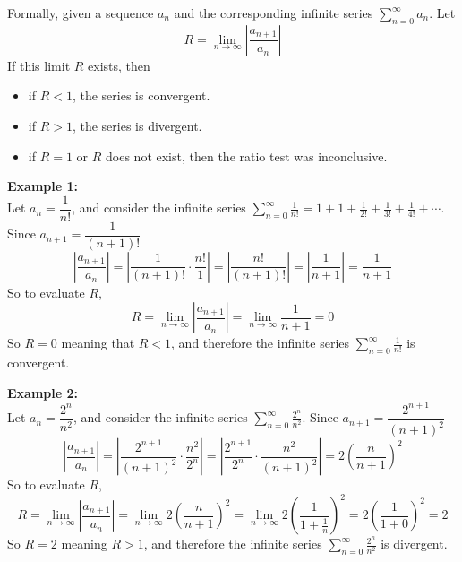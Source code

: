 \documentclass[]{report}
\begin{document}
Formally, given a sequence $a_n$ and the corresponding infinite series $\displaystyle \sum_{n=0}^\infty a_n$. Let
\begin{equation*}
  R=\lim_{n \to \infty} \left|\frac{a_{n+1}}{a_n}\right|
\end{equation*}
If this limit $R$ exists, then
\begin{itemize}
\item if $R<1$, the series is convergent.
\item if $R>1$, the series is divergent.
\item if $R=1$ or $R$ does not exist, then the ratio test was inconclusive.
\end{itemize}
\noindent  \textbf{Example 1:}\\
Let $a_n=\dfrac{1}{n!}$, and consider the infinite series $\displaystyle \sum_{n=0}^{\infty} \frac{1}{n!} = 1+1+\frac{1}{2!}+\frac{1}{3!}+\frac{1}{4!}+\cdots$. Since $a_{n+1}=\dfrac{1}{(n+1)!}$
\begin{equation*}
  \left| \frac{a_{n+1}}{a_n}\right|=\left| \frac{1}{(n+1)!}\cdot \frac{n!}{1}\right|=\left| \frac{n!}{(n+1)!}\right|=\left| \frac{1}{n+1}\right|=\frac{1}{n+1}
\end{equation*}
So to evaluate $R$,
\begin{equation*}
  R=\lim_{n \to \infty} \left|\frac{a_{n+1}}{a_n}\right|=\lim_{n \to \infty} \frac{1}{n+1}=0
\end{equation*}
So $R=0$ meaning that $R<1$, and therefore the infinite series $ \sum_{n=0}^{\infty} \frac{1}{n!}$ is convergent.

\noindent  \textbf{Example 2:}\\
Let $a_n=\dfrac{2^n}{n^2}$, and consider the infinite series $\displaystyle \sum_{n=0}^{\infty} \frac{2^n}{n^2}$. Since $a_{n+1}=\dfrac{2^{n+1}}{(n+1)^2}$
\begin{equation*}
  \left| \frac{a_{n+1}}{a_n}\right|=\left| \frac{2^{n+1}}{(n+1)^2}\cdot \frac{n^2}{2^n}\right|=\left| \frac{2^{n+1}}{2^n}\cdot\frac{n^2}{(n+1)^2}\right|=2 \left(\frac{n}{n+1}\right)^2
\end{equation*}
So to evaluate $R$,
\begin{equation*}
  R=\lim_{n \to \infty} \left|\frac{a_{n+1}}{a_n}\right|=\lim_{n \to \infty} 2 \left(\frac{n}{n+1}\right)^2=\lim_{n \to \infty} 2 \left(\frac{1}{1+\frac{1}{n}}\right)^2=2\left(\frac{1}{1+0}\right)^2=2
\end{equation*}
So $R=2$ meaning $R>1$, and therefore the infinite series $\displaystyle \sum_{n=0}^{\infty} \frac{2^n}{n^2}$ is divergent.
\end{document}
